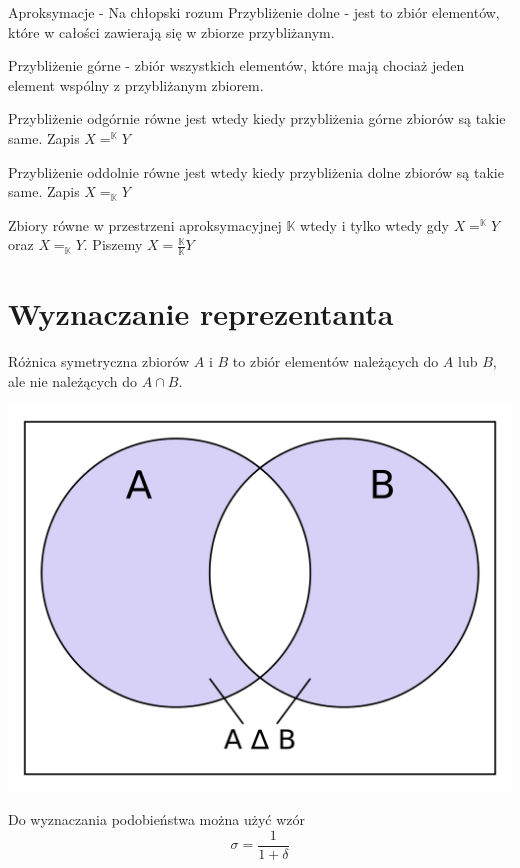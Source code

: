\documentclass[12pt]{article}
\newcommand{\bbk}{\mathbb{K}}
\begin{document}
\begin{blad}{Aproksymacje - Na chłopski rozum}
    Przybliżenie dolne - jest to zbiór elementów, które w całości zawierają się w zbiorze przybliżanym.

    Przybliżenie górne - zbiór wszystkich elementów, które mają chociaż jeden element wspólny z przybliżanym zbiorem.

    Przybliżenie odgórnie równe jest wtedy kiedy przybliżenia górne zbiorów są takie same. Zapis $ X = ^{\bbk}Y $

    Przybliżenie oddolnie równe jest wtedy kiedy przybliżenia dolne zbiorów są takie same. Zapis $ X = _{\bbk}Y $

    Zbiory równe w przestrzeni aproksymacyjnej $ \bbk $ wtedy i tylko wtedy gdy $ X = ^{\bbk}Y $ oraz $ X = _{\bbk}Y $. Piszemy $ X = \frac{\bbk}{\bbk}Y $
\end{blad}

\section{Wyznaczanie reprezentanta}

Różnica symetryczna zbiorów $A$ i $B$ to zbiór elementów należących do $A$ lub $B$, ale nie należących do $A \cap B$.

\begin{center}
    \includegraphics[scale=0.1]{roznicasymetryczna.png}
\end{center}

Do wyznaczania podobieństwa można użyć wzór 
\[ \sigma = \frac{1}{1 + \delta} \]
\end{document}
